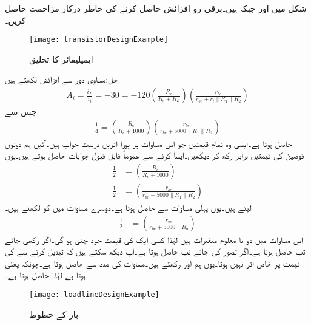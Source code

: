 شکل  میں  اور  جبکہ  ہیں۔برقی رو افزائش  حاصل کرنے کی خاطر  درکار مزاحمت حاصل کریں۔
\begin{figure}
\centering
\texttt{[image: transistorDesignExample]}
\caption{ایمپلیفائر کا تخلیق}
\label{شکل_ٹرانزسٹر_ایمپلیفائر_تخلیق}
\end{figure}

حل:مساوی دور سے افزائش لکھتے ہیں
\begin{align*}
A_i =\frac{i_L}{i_i}=-30 =-120 \left(\frac{R_c}{R_c+R_L}\right) \left(\frac{r_{be}}{r_{be}+r_i \mathbin{\|} R_1 \mathbin{\|} R_2} \right)
\end{align*}
جس سے 
\begin{align}
\frac{1}{4}=\left(\frac{R_c}{R_c+1000}\right) \left(\frac{r_{be}}{r_{be}+5000 \mathbin{\|} R_1 \mathbin{\|} R_2} \right)
\end{align}
حاصل ہوتا ہے۔ایسی وہ تمام قیمتیں جو اس مساوات پر پورا اتریں درست جواب ہیں۔آئیں ہم دونوں قوصین کی قیمتیں برابر رکھ کر دیکھیں۔ایسا کرنے سے عموماً قابل قبول جوابات حاصل ہوتے ہیں۔یوں
\begin{align*}
\frac{1}{2}&=\left(\frac{R_c}{R_c+1000}\right)\\
\frac{1}{2}&=\left(\frac{r_{be}}{r_{be}+5000 \mathbin{\|} R_1 \mathbin{\|} R_2} \right)
\end{align*}
لیتے ہیں۔یوں پہلی مساوات سے  حاصل ہوتا ہے۔دوسرے مساوات میں  کو  لکھتے ہیں۔
\begin{align*}
\frac{1}{2}&=\left(\frac{r_{be}}{r_{be}+5000 \mathbin{\|} R_b} \right)
\end{align*}
اس مساوات میں دو نا معلوم متغیرات ہیں لہٰذا کسی ایک کی قیمت خود چنی ہو گی۔اگر  رکھی جائے تب  حاصل ہوتا ہے۔اگر  تصور کی جائے تب  حاصل ہوتا ہے۔آپ دیکھ سکتے ہیں کہ   تبدیل کرنے سے  کی قیمت پر خاص اثر نہیں ہوتا۔یوں ہم  اور   رکھتے ہیں۔مساوات  کی مدد سے   حاصل ہوتا ہے۔چونکہ  یعنی  ہوتا ہے لہٰذا  حاصل ہوتا ہے۔
\begin{figure}
\centering
\texttt{[image: loadlineDesignExample]}
\caption{بار کے خطوط}
\label{شکل_ٹرانزسٹر_ایمپلیفائر_تخلیق_بار_خطوط}
\end{figure}

